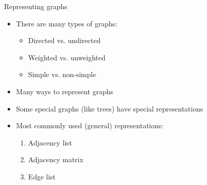\documentclass[12pt,t]{beamer}
\newcommand{\bi}{\begin{itemize}}
\newcommand{\ei}{\end{itemize}}
\begin{document}


\begin{frame}{Representing graphs}
    \vspace{20pt}
    \bi
        \item There are many types of graphs:
            \bi
                \item Directed vs. undirected
                \item Weighted vs. unweighted
                \item Simple vs. non-simple
            \ei
        \item Many ways to represent graphs
        \item Some special graphs (like trees) have special representations
        \item Most commonly used (general) representations:
            \begin{enumerate}
                \item Adjacency list
                \item Adjacency matrix
                \item Edge list
            \end{enumerate}
    \ei
\end{frame}
\end{document}
